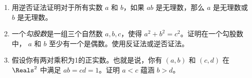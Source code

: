 \begin{enumerate}
{  \[ \forall x, y \in \Integers, \; x=y \, \implies \, x+y \; \mbox{is even}. \]
  
  
  但证明那个是显而易见的！
  }
  
  \wbvfill
  
  \workbookpagebreak
  
  \item 
  用逆否证法证明对于所有实数 $a$ 和 $b$，如果 $ab$ 是无理数，那么 $a$ 是无理数或 $b$ 是无理数。
  
  \wbvfill
  
  
  
  \item
  一个\emph{勾股数}是一组三个自然数 $a, b, c$，使得 $a^2 + b^2 = c^2$。证明在一个勾股数中， $a$ 和 $b$ 至少有一个是偶数。使用反证法或逆否证法。
  
  \wbvfill
  
  \workbookpagebreak
  
  \item 
  假设你有两对乘积为1的正实数。也就是说，你有 $(a,b)$ 和 $(c,d)$ 在 $\Reals^2$ 中满足 $ab=cd=1$。证明 $a < c$ 蕴涵 $b > d$。
  
    
    \wbvfill
    
    \workbookpagebreak
    
  \end{enumerate}